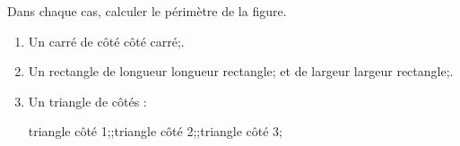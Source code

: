 \documentclass[exercice]{thedocument}%
\begin{document}
%
\smallskip\par\noindent Dans chaque cas, calculer le périmètre de la figure.
\begin{enumerate}
    \item Un carré de côté \<côté carré;.
    \item Un rectangle de longueur \<longueur rectangle; et de largeur
    \<largeur rectangle;.
    \item Un triangle de côtés :\par
    \qquad\<triangle côté 1;;\qquad\<triangle côté 2;;\qquad\<triangle côté 3;
\end{enumerate}
\end{document}
